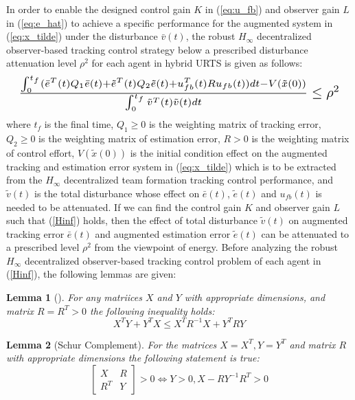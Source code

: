 \documentclass{ieeeaccess}
\newtheorem{lemma}{Lemma}
\begin{document}
In order to enable the designed control gain $K$ in (\ref{eq:u_fb}) and observer gain $L$ in (\ref{eq:e_hat}) to achieve a specific performance for the augmented system in (\ref{eq:x_tilde}) under the disturbance $\bar{v}(t)$, the robust $H_\infty$ decentralized observer-based tracking control strategy below a prescribed disturbance attenuation level $\rho^2$ for each agent in hybrid URTS is given as follows:
\begin{equation} \label{Hinf}
    \resizebox{1\hsize}{!}{    
        $\frac{\int_{0}^{t_f}(\bar{e}^T(t)Q_1\bar{e}(t) + \tilde{e}^T(t)Q_2\tilde{e}(t) + u_{fb}^T(t)Ru_{fb}(t))dt - V(\tilde{x}(0))}{\int_{0}^{t_f}\tilde{v}^T(t)\tilde{v}(t)dt}\leq \rho^2$
    }
\end{equation}
where $t_f$ is the final time, $Q_1 \geq 0$ is the weighting matrix of tracking error, $Q_2 \geq 0$ is the weighting matrix of estimation error, $R > 0$ is the weighting matrix of control effort, $V(\tilde{x}(0))$ is the initial condition effect on the augmented tracking and estimation error system in (\ref{eq:x_tilde}) which is to be extracted from the $H_\infty$ decentralized team formation tracking control performance, and $\tilde{v}(t)$ is the total disturbance whose effect on $\bar{e}(t)$, $\tilde{e}(t)$ and $u_{fb}(t)$ is needed to be attenuated. If we can find the control gain $K$ and observer gain $L$ such that (\ref{Hinf}) holds, then the effect of total disturbance $\tilde{v}(t)$ on augmented tracking error $\bar{e}(t)$ and augmented estimation error $\tilde{e}(t)$ can be attenuated to a prescribed level $\rho^2$ from the viewpoint of energy. Before analyzing the robust $H_\infty$ decentralized observer-based tracking control problem of each agent in (\ref{Hinf}), the following lemmas are given:
\begin{lemma}[\cite{boyd1994linear}] \label{lemma1}
    For any matriices $X$ and $Y$ with appropriate dimensions, and matrix $R=R^T>0$ the following inequality holds:
    \begin{equation} \label{}
        X^T Y + Y^T X \leq X^T R^{-1}X + Y^T R Y
    \end{equation}  
\end{lemma}
\begin{lemma}[Schur Complement\cite{boyd1994linear}] \label{lemma2}
    For the matrices $X=X^T,Y=Y^T$ and matrix $R$ with appropriate dimensions the following statement is true:
    \begin{equation} \label{}
        \begin{bmatrix}
            X & R \\ R^T & Y 
        \end{bmatrix} > 0 \Leftrightarrow Y>0, X-RY^{-1}R^T>0
    \end{equation}
\end{lemma}
\end{document}
